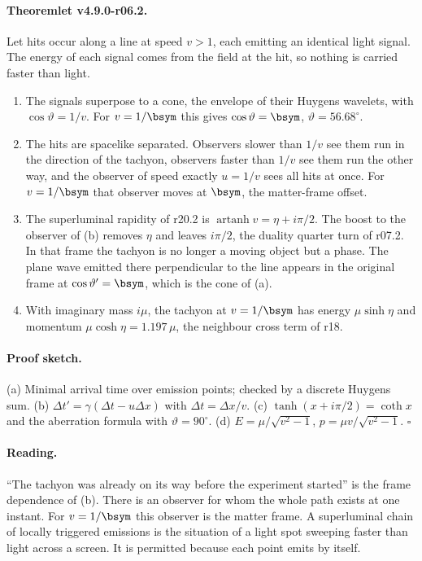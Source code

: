 \paragraph{Theoremlet v4.9.0-r06.2.}
Let hits occur along a line at speed \(v>1\), each emitting an identical light signal.  The energy of each signal comes
from the field at the hit, so nothing is carried faster than light.
\begin{enumerate}[leftmargin=2em]
\item[(a)] The signals superpose to a cone, the envelope of their Huygens wavelets, with \(\cos\vartheta=1/v\).  For
\(v=1/\bsym\) this gives \(\cos\vartheta=\bsym\), \(\vartheta=56.68^\circ\).
\item[(b)] The hits are spacelike separated.  Observers slower than \(1/v\) see them run in the direction of the
tachyon, observers faster than \(1/v\) see them run the other way, and the observer of speed exactly \(u=1/v\) sees all hits
at once.  For \(v=1/\bsym\) that observer moves at \(\bsym\), the matter-frame offset.
\item[(c)] The superluminal rapidity of r20.2 is \(\operatorname{artanh}v=\eta+i\pi/2\).  The boost to the observer of (b)
removes \(\eta\) and leaves \(i\pi/2\), the duality quarter turn of r07.2.  In that frame the tachyon is no longer a moving
object but a phase.  The plane wave emitted there perpendicular to the line appears in the original frame at
\(\cos\vartheta'=\bsym\), which is the cone of (a).
\item[(d)] With imaginary mass \(i\mu\), the tachyon at \(v=1/\bsym\) has energy \(\mu\sinh\eta\) and momentum
\(\mu\cosh\eta=1.197\,\mu\), the neighbour cross term of r18.
\end{enumerate}

\paragraph{Proof sketch.}
(a) Minimal arrival time over emission points; checked by a discrete Huygens sum.  (b)
\(\Delta t'=\gamma(\Delta t-u\Delta x)\) with \(\Delta t=\Delta x/v\).  (c) \(\tanh(x+i\pi/2)=\coth x\) and the aberration
formula with \(\vartheta=90^\circ\).  (d) \(E=\mu/\sqrt{v^2-1}\), \(p=\mu v/\sqrt{v^2-1}\).  \(\square\)

\paragraph{Reading.}
``The tachyon was already on its way before the experiment started'' is the frame dependence of (b).  There is an
observer for whom the whole path exists at one instant.  For \(v=1/\bsym\) this observer is the matter frame.  A
superluminal chain of locally triggered emissions is the situation of a light spot sweeping faster than light across a
screen.  It is permitted because each point emits by itself.

